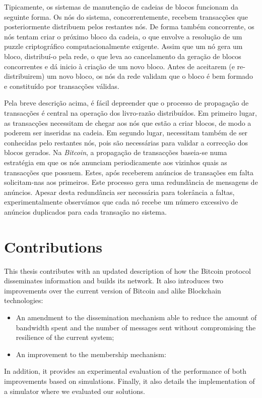 Tipicamente, os sistemas de manutenção de cadeias de blocos funcionam da seguinte forma. Os nós do sistema, concorrentemente, recebem transacções que posteriormente distribuem pelos restantes nós. De forma também concorrente, os nós tentam criar o próximo bloco da cadeia, o que envolve a resolução de um puzzle criptográfico computacionalmente exigente.
Assim que um nó gera um bloco, distribuí-o pela rede, o que leva ao cancelamento da geração de blocos concorrentes e dá inicio à criação de um novo bloco. Antes de aceitarem (e re-distribuirem) um novo bloco, os nós da rede validam que o bloco é bem formado e constituído por transacções válidas.

Pela breve descrição acima, é fácil depreender que o processo de propagação de transacções é central na operação dos livro-razão distribuídos. Em primeiro lugar, as transacções necessitam de chegar aos nós que estão a criar blocos, de modo a poderem ser inseridas na cadeia. Em segundo lugar, necessitam também de ser conhecidas pelo restantes nós, pois são necessárias para validar a correcção dos blocos gerados. Na \emph{Bitcoin}, a propagação de transacções baseia-se numa estratégia em que os nós anunciam periodicamente aos vizinhos quais as transacções que possuem. Estes, após receberem anúncios de transações em falta solicitam-nas aos primeiros.
Este processo gera uma redundância de mensagens de anúncios.
Apesar desta redundância ser necessária para tolerância a faltas, experimentalmente observámos que cada nó recebe um número excessivo de anúncios duplicados para cada transação no sistema.

\section{Contributions}
This thesis contributes with an updated description of how the Bitcoin protocol disseminates information and builds its network. It also introduces  two improvements over the current version of Bitcoin and alike Blockchain technologies:
\begin{itemize}
\item An amendment to the dissemination mechanism able to reduce the amount of bandwidth spent and the number of messages sent without compromising the resilience of the current system;
\item An improvement to the membership mechanism:
\end{itemize}
In addition, it provides an experimental evaluation of the performance of both improvements based on simulations.
Finally, it also details the implementation of a simulator where we evaluated our solutions.

